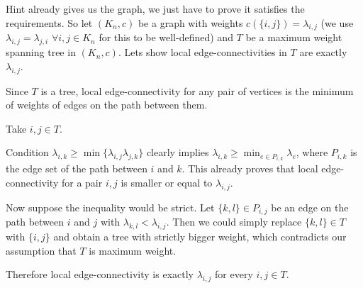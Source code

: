 \newcommand{\sheet}{7}




\maketitle

\begin{exercise}{1}
    Hint already gives us the graph, we just have to prove it satisfies the
    requirements. So let $(K_n, c)$ be a graph with weights $c(\{i, j\}) =
    \lambda_{i, j}$ (we use $\lambda_{i, j} = \lambda_{j, i}$ $\forall i, j \in
    K_n$ for this to be well-defined) and $T$ be a maximum weight spanning tree
    in $(K_n, c)$. Lets show local edge-connectivities in $T$ are exactly
    $\lambda_{i, j}$.

    Since $T$ is a tree, local edge-connectivity for any pair of vertices is the
    minimum of weights of edges on the path between them.

    Take $i, j \in T$.

    Condition $\lambda_{i, k} \geq \min\{\lambda_{i, j} \lambda_{j, k}\}$
    clearly implies $\lambda_{i, k} \geq \min_{e \in P_{i, k}} \lambda_e$, where
    $P_{i, k}$ is the edge set of the path between $i$ and $k$. This already
    proves that local edge-connectivity for a pair $i, j$ is smaller or equal to
    $\lambda_{i, j}$.

    Now suppose the inequality would be strict. Let $\{k, l\} \in P_{i, j}$ be
    an edge on the path between $i$ and $j$ with $\lambda_{k, l} < \lambda_{i,
    j}$. Then we could simply replace $\{k, l\} \in T$ with $\{i, j\}$ and
    obtain a tree with strictly bigger weight, which contradicts our assumption
    that $T$ is maximum weight.

    Therefore local edge-connectivity is exactly $\lambda_{i, j}$ for every $i,
    j \in T$.
\end{exercise}

